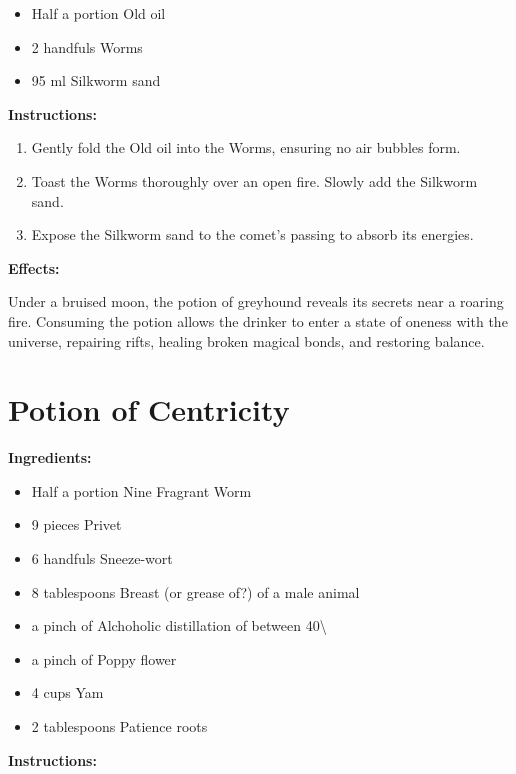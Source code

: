 \documentclass{article}
\begin{document}
\begin{itemize}
  \item Half a portion Old oil
  \item 2 handfuls Worms
  \item 95 ml Silkworm sand
\end{itemize}

\textbf{Instructions:}

\begin{enumerate}
  \item Gently fold the Old oil into the Worms, ensuring no air bubbles form.
  \item Toast the Worms thoroughly over an open fire. Slowly add the Silkworm sand.
  \item Expose the Silkworm sand to the comet’s passing to absorb its energies.
\end{enumerate}

\textbf{Effects:}

Under a bruised moon, the potion of greyhound reveals its secrets near a roaring fire. Consuming the potion allows the drinker to enter a state of oneness with the universe, repairing rifts, healing broken magical bonds, and restoring balance.

\newpage
\section*{Potion of Centricity}

\textbf{Ingredients:}

\begin{itemize}
  \item Half a portion Nine Fragrant Worm
  \item 9 pieces Privet
  \item 6 handfuls Sneeze-wort
  \item 8 tablespoons Breast (or grease of?) of a male animal
  \item a pinch of Alchoholic distillation of between 40\textbackslash{}%
  \item a pinch of Poppy flower
  \item 4 cups Yam
  \item 2 tablespoons Patience roots
\end{itemize}

\textbf{Instructions:}
\end{document}
